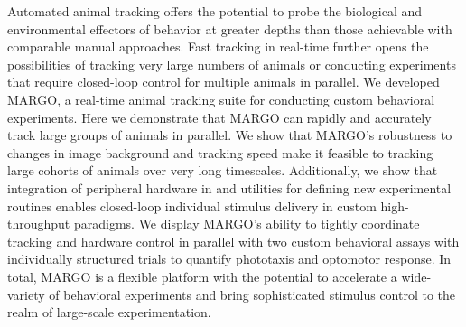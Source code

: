 \documentclass[10pt]{article}
\begin{document}
Automated animal tracking offers the potential to probe the biological and environmental effectors of behavior at greater depths than those achievable with comparable manual approaches. Fast tracking in real-time further opens the possibilities of tracking very large numbers of animals or conducting experiments that require closed-loop control for multiple animals in parallel. We developed MARGO, a real-time animal tracking suite for conducting custom behavioral experiments. Here we demonstrate that MARGO can rapidly and accurately track large groups of animals in parallel. We show that MARGO's robustness to changes in image background and tracking speed make it feasible to tracking large cohorts of animals over very long timescales. Additionally, we show that integration of peripheral hardware in and utilities for defining new experimental routines enables closed-loop individual stimulus delivery in custom high-throughput paradigms. We display MARGO's ability to tightly coordinate tracking and hardware control in parallel with two custom behavioral assays with individually structured trials to quantify phototaxis and optomotor response. In total, MARGO is a flexible platform with the potential to accelerate a wide-variety of behavioral experiments and bring sophisticated stimulus control to the realm of large-scale experimentation.
\end{document}

